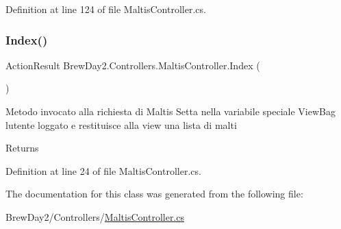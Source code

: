 Definition at line 124 of file Maltis\+Controller.\+cs.

\mbox{\label{class_brew_day2_1_1_controllers_1_1_maltis_controller_aa27332bf97a63faff79d3020fbf75b10}} 
\subsubsection{\texorpdfstring{Index()}{Index()}}
{\footnotesize\ttfamily Action\+Result Brew\+Day2.\+Controllers.\+Maltis\+Controller.\+Index (\begin{DoxyParamCaption}{ }\end{DoxyParamCaption})}



Metodo invocato alla richiesta di Maltis Setta nella variabile speciale View\+Bag l\textquotesingle{}utente loggato e restituisce alla view una lista di malti 

\begin{DoxyReturn}{Returns}

\end{DoxyReturn}


Definition at line 24 of file Maltis\+Controller.\+cs.



The documentation for this class was generated from the following file\+:\begin{DoxyCompactItemize}
\item 
Brew\+Day2/\+Controllers/\mbox{\hyperlink{_maltis_controller_8cs}{Maltis\+Controller.\+cs}}\end{DoxyCompactItemize}
